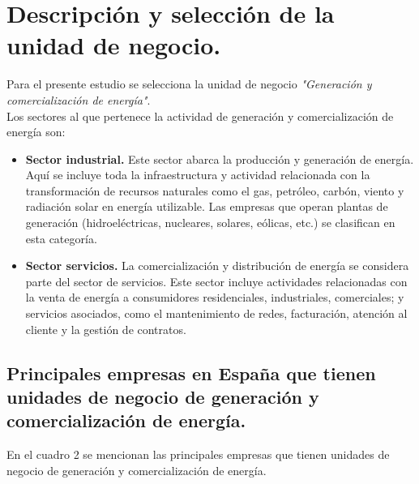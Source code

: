 \documentclass{article}
\begin{document}
\section{Descripción y selección de la unidad de negocio.}
Para el presente estudio se selecciona la unidad de negocio \textit{"Generación y comercialización de energía"}. 
\\
Los sectores al que pertenece la actividad de generación y comercialización de energía son: 
\begin{itemize}
    \item \textbf{Sector industrial.} Este sector abarca la producción y generación de energía. Aquí se incluye toda la infraestructura y actividad relacionada con la transformación de recursos naturales como el gas, petróleo, carbón, viento y radiación solar en energía utilizable. Las empresas que operan plantas de generación (hidroeléctricas, nucleares, solares, eólicas, etc.) se clasifican en esta categoría.
    \item \textbf{Sector servicios.} La comercialización y distribución de energía se considera parte del sector de servicios. Este sector incluye actividades relacionadas con la venta de energía a consumidores residenciales, industriales, comerciales; y servicios asociados, como el mantenimiento de redes, facturación, atención al cliente y la gestión de contratos.
\end{itemize}

\subsection{Principales empresas en España que tienen unidades de negocio de generación y comercialización de energía.}
En el cuadro 2 se mencionan las principales empresas que tienen unidades de negocio de generación y comercialización de energía. 
\\
\end{document}
